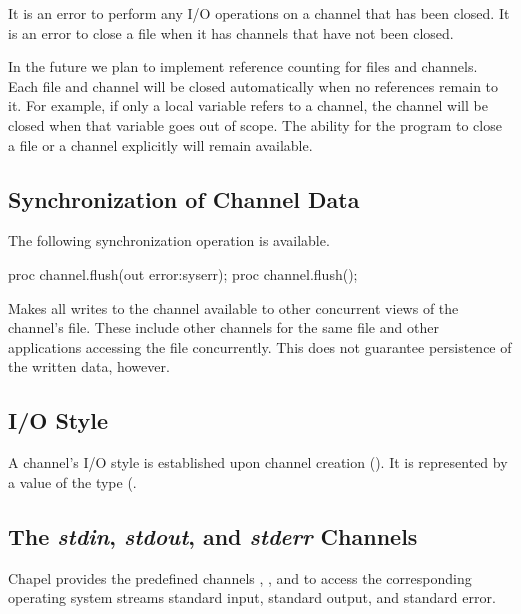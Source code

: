It is an error to perform any I/O operations on a channel
that has been closed.
It is an error to close a file when it has channels that
have not been closed.

\begin{future}
In the future we plan to implement reference counting for files
and channels. Each file and channel will be closed automatically
when no references remain to it. For example, if only a local
variable refers to a channel, the channel will be closed
when that variable goes out of scope.
The ability for the program to close a file or a channel
explicitly will remain available.
\end{future}


\subsection{Synchronization of Channel Data}
\label{IO_channel_synchronization}

The following synchronization operation is available.

\begin{protohead}
proc channel.flush(out error:syserr);
proc channel.flush();
\end{protohead}
\begin{protobody}
Makes all writes to the channel available to other concurrent views of the
channel's file. These include other channels for the same file and
other applications accessing the file concurrently.
This does not guarantee persistence of the written data, however.
\end{protobody}


\subsection{I/O Style}
\label{IO_io_style}

A channel's I/O style is established upon channel creation
().
It is represented by a value of the  type
(.


\subsection{The {\em stdin}, {\em stdout}, and {\em stderr} Channels}
\label{IO_std_channels}

Chapel provides the predefined channels , ,
and  to access the corresponding operating system streams
standard input, standard output, and standard error.


